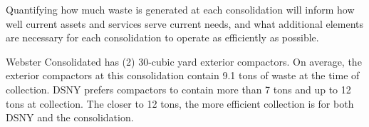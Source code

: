 
    Quantifying how much waste is generated at each consolidation will inform how well current assets and services serve current needs, and what additional elements are necessary for each consolidation to operate as efficiently as possible.
    
    Webster Consolidated has (2) 30-cubic yard exterior compactors. On average, the exterior compactors at this consolidation contain 9.1 tons of waste at the time of collection. DSNY prefers compactors to contain more than 7 tons and up to 12 tons at collection. The closer to 12 tons, the more efficient collection is for both DSNY and the consolidation.